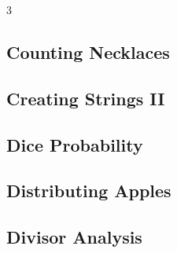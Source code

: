 \documentclass[8pt]{extarticle}
\begin{document}
\begin{multicols*}{3}
\subsection{Counting Necklaces}
\begin{caixaenunciado}

\end{caixaenunciado}
\vspace{0.3cm}


\subsection{Creating Strings II}
\begin{caixaenunciado}

\end{caixaenunciado}
\vspace{0.3cm}


\subsection{Dice Probability}
\begin{caixaenunciado}

\end{caixaenunciado}
\vspace{0.3cm}


\subsection{Distributing Apples}
\begin{caixaenunciado}

\end{caixaenunciado}
\vspace{0.3cm}


\subsection{Divisor Analysis}
\begin{caixaenunciado}

\end{caixaenunciado}
\vspace{0.3cm}



\end{multicols*}
\end{document}
